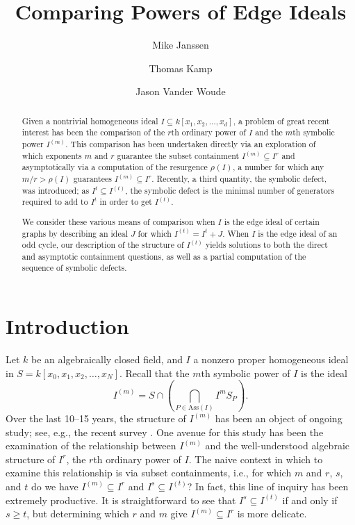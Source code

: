 \documentclass[12pt]{amsart}
\title{Comparing Powers of Edge Ideals}
\author{Mike Janssen}
\author{Thomas Kamp}
\author{Jason Vander Woude}
\def\Ass{{\text{Ass}}}
\renewcommand{\ge}{\geqslant}
\theoremstyle{plain}
\theoremstyle{definition}
\begin{document}
\maketitle

\begin{abstract}
	Given a nontrivial homogeneous ideal $I\subseteq k[x_1,x_2,\ldots,x_d]$, a problem of great recent interest has been the comparison of the $r$th ordinary power of $I$ and the $m$th symbolic power $I^{(m)}$.
	This comparison has been undertaken directly via an exploration of which exponents $m$ and $r$ guarantee the subset containment $I^{(m)}\subseteq I^r$ and asymptotically via a computation of the resurgence $\rho(I)$, a number for which any $m/r > \rho(I)$ guarantees $I^{(m)}\subseteq I^r$.
	Recently, a third quantity, the symbolic defect, was introduced; as $I^t\subseteq I^{(t)}$, the symbolic defect is the minimal number of generators required to add to $I^t$ in order to get $I^{(t)}$.
	
	We consider these various means of comparison when $I$ is the edge ideal of certain graphs by describing an ideal $J$ for which $I^{(t)} = I^t + J$.
	When $I$ is the edge ideal of an odd cycle, our description of the structure of $I^{(t)}$ yields solutions to both the direct and asymptotic containment questions, as well as a partial computation of the sequence of symbolic defects.
\end{abstract}




\section{Introduction}


Let $k$ be an algebraically closed field, and $I$ a nonzero proper homogeneous ideal in $S = k[x_0,x_1,x_2,\ldots,x_N]$.
Recall that the $m$th symbolic power of $I$ is the ideal
\[
	I^{(m)} = S \cap \left(\bigcap\limits_{P\in \Ass(I)} I^m S_P\right).
\]
Over the last 10--15 years, the structure of $I^{(m)}$ has been an object of ongoing study; see, e.g., the recent survey \cite{2017DaoEtAl}.
One avenue for this study has been the examination of the relationship between $I^{(m)}$ and the well-understood algebraic structure of $I^r$, the $r$th ordinary power of $I$.
The naive context in which to examine this relationship is via subset containments, i.e., for which $m$ and $r$, $s$, and $t$ do we have $I^{(m)}\subseteq I^r$ and $I^{s} \subseteq I^{(t)}$?
In fact, this line of inquiry has been extremely productive.
It is straightforward to see that $I^s \subseteq I^{(t)}$ if and only if $s \ge t$, but determining which $r$ and $m$ give $I^{(m)} \subseteq I^r$ is more delicate.
\end{document}
